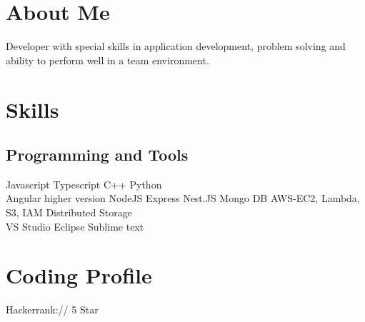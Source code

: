 \documentclass[]{deedy-resume-openfont}
\begin{document}
%
%


%
%



%
%
\begin{minipage}[t]{0.32\textwidth} 

\section{About Me}
Developer with special skills in application development, problem solving and ability to perform well in a team environment.
\sectionsep

\section{Skills}
\subsection{Programming and Tools}
Javascript \textbullet{}   Typescript \textbullet{}  C++ \textbullet{} Python\\
Angular higher version \textbullet{} NodeJS \textbullet{} Express \textbullet{} Nest.JS \textbullet{}  Mongo DB \textbullet{} AWS-EC2, Lambda, S3, IAM  \textbullet{} Distributed Storage \\
VS Studio \textbullet{} Eclipse \textbullet{} Sublime text
\sectionsep


\section{Coding Profile} 
Hackerrank:// \href{https://www.hackerrank.com/mondalkoushik508}{} 5 Star \\
\sectionsep


\end{minipage}
\end{document}
